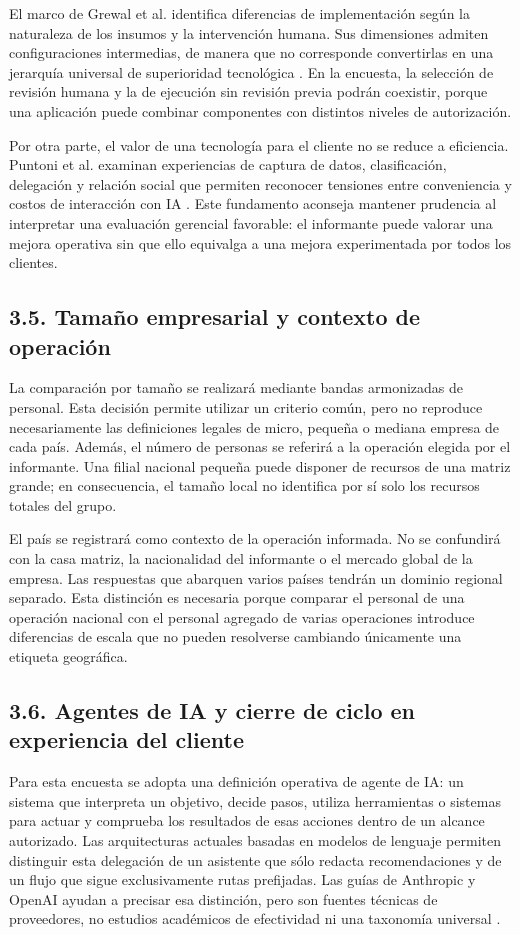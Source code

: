 \documentclass[12pt,letterpaper]{article}
\begin{document}
El marco de Grewal et al. identifica diferencias de implementación según la naturaleza de los insumos y la intervención humana. Sus dimensiones admiten configuraciones intermedias, de manera que no corresponde convertirlas en una jerarquía universal de superioridad tecnológica \citep{grewal}. En la encuesta, la selección de revisión humana y la de ejecución sin revisión previa podrán coexistir, porque una aplicación puede combinar componentes con distintos niveles de autorización.

Por otra parte, el valor de una tecnología para el cliente no se reduce a eficiencia. Puntoni et al. examinan experiencias de captura de datos, clasificación, delegación y relación social que permiten reconocer tensiones entre conveniencia y costos de interacción con IA \citep{puntoni}. Este fundamento aconseja mantener prudencia al interpretar una evaluación gerencial favorable: el informante puede valorar una mejora operativa sin que ello equivalga a una mejora experimentada por todos los clientes.

\subsection*{3.5. Tamaño empresarial y contexto de operación}
La comparación por tamaño se realizará mediante bandas armonizadas de personal. Esta decisión permite utilizar un criterio común, pero no reproduce necesariamente las definiciones legales de micro, pequeña o mediana empresa de cada país. Además, el número de personas se referirá a la operación elegida por el informante. Una filial nacional pequeña puede disponer de recursos de una matriz grande; en consecuencia, el tamaño local no identifica por sí solo los recursos totales del grupo.

El país se registrará como contexto de la operación informada. No se confundirá con la casa matriz, la nacionalidad del informante o el mercado global de la empresa. Las respuestas que abarquen varios países tendrán un dominio regional separado. Esta distinción es necesaria porque comparar el personal de una operación nacional con el personal agregado de varias operaciones introduce diferencias de escala que no pueden resolverse cambiando únicamente una etiqueta geográfica.

\subsection*{3.6. Agentes de IA y cierre de ciclo en experiencia del cliente}
Para esta encuesta se adopta una definición operativa de agente de IA: un sistema que interpreta un objetivo, decide pasos, utiliza herramientas o sistemas para actuar y comprueba los resultados de esas acciones dentro de un alcance autorizado. Las arquitecturas actuales basadas en modelos de lenguaje permiten distinguir esta delegación de un asistente que sólo redacta recomendaciones y de un flujo que sigue exclusivamente rutas prefijadas. Las guías de Anthropic y OpenAI ayudan a precisar esa distinción, pero son fuentes técnicas de proveedores, no estudios académicos de efectividad ni una taxonomía universal \citep{anthropic,openaiguide}.
\end{document}
